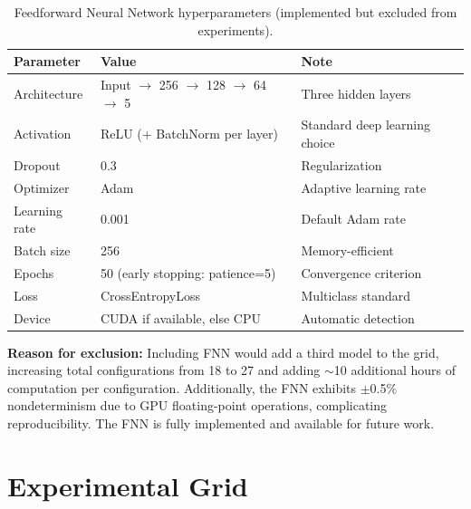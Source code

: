 \begin{table}[h]
\centering
\caption{Feedforward Neural Network hyperparameters (implemented but excluded from experiments).}
\label{tab:fnn_params}
\begin{tabular}{l l l}
\toprule
\textbf{Parameter} & \textbf{Value} & \textbf{Note} \\
\midrule
Architecture          & Input $\rightarrow$ 256 $\rightarrow$ 128 $\rightarrow$ 64 $\rightarrow$ 5 & Three hidden layers \\
Activation            & ReLU (+ BatchNorm per layer)     & Standard deep learning choice \\
Dropout               & 0.3                              & Regularization \\
Optimizer             & Adam                             & Adaptive learning rate \\
Learning rate         & 0.001                            & Default Adam rate \\
Batch size            & 256                              & Memory-efficient \\
Epochs                & 50 (early stopping: patience=5)  & Convergence criterion \\
Loss                  & CrossEntropyLoss                 & Multiclass standard \\
Device                & CUDA if available, else CPU       & Automatic detection \\
\bottomrule
\end{tabular}
\end{table}

\textbf{Reason for exclusion:} Including FNN would add a third model to the grid, increasing total configurations from 18 to 27 and adding $\sim$10 additional hours of computation per configuration. Additionally, the FNN exhibits $\pm$0.5\% nondeterminism due to GPU floating-point operations, complicating reproducibility. The FNN is fully implemented and available for future work.

\section{Experimental Grid}
\label{sec:app_grid}

